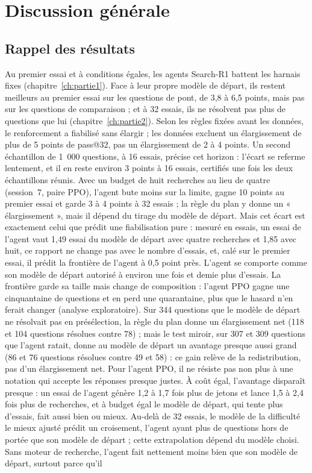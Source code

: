 \chapter{Discussion générale}\label{ch:discussion}

\section{Rappel des résultats}
Au premier essai et à conditions égales, les agents Search-R1 battent les harnais fixes (chapitre~\ref{ch:partie1}). Face à leur propre modèle de départ, ils restent meilleurs au premier essai sur les questions de pont, de 3,8 à 6,5 points, mais pas sur les questions de comparaison ; et à 32 essais, ils ne résolvent pas plus de questions que lui (chapitre~\ref{ch:partie2}). Selon les règles fixées avant les données, le renforcement a fiabilisé sans élargir ; les données excluent un élargissement de plus de 5 points de pass@32, pas un élargissement de 2 à 4 points. Un second échantillon de 1~000 questions, à 16 essais, précise cet horizon : l'écart se referme lentement, et il en reste environ 3 points à 16 essais, certifiés une fois les deux échantillons réunis. Avec un budget de huit recherches au lieu de quatre (session~7, paire PPO), l'agent bute moins sur la limite, gagne 10 points au premier essai et garde 3 à 4 points à 32 essais ; la règle du plan y donne un « élargissement », mais il dépend du tirage du modèle de départ. Mais cet écart est exactement celui que prédit une fiabilisation pure : mesuré en essais, un essai de l'agent vaut 1,49 essai du modèle de départ avec quatre recherches et 1,85 avec huit, ce rapport ne change pas avec le nombre d'essais, et, calé sur le premier essai, il prédit la frontière de l'agent à 0,5 point près. L'agent se comporte comme son modèle de départ autorisé à environ une fois et demie plus d'essais. La frontière garde sa taille mais change de composition : l'agent PPO gagne une cinquantaine de questions et en perd une quarantaine, plus que le hasard n'en ferait changer (analyse exploratoire). Sur 344 questions que le modèle de départ ne résolvait pas en présélection, la règle du plan donne un élargissement net (118 et 104 questions résolues contre 78) ; mais le test miroir, sur 307 et 309 questions que l'agent ratait, donne au modèle de départ un avantage presque aussi grand (86 et 76 questions résolues contre 49 et 58) : ce gain relève de la redistribution, pas d'un élargissement net. Pour l'agent PPO, il ne résiste pas non plus à une notation qui accepte les réponses presque justes. À coût égal, l'avantage disparaît presque : un essai de l'agent génère 1,2 à 1,7 fois plus de jetons et lance 1,5 à 2,4 fois plus de recherches, et à budget égal le modèle de départ, qui tente plus d'essais, fait aussi bien ou mieux. Au-delà de 32 essais, le modèle de la difficulté le mieux ajusté prédit un croisement, l'agent ayant plus de questions hors de portée que son modèle de départ ; cette extrapolation dépend du modèle choisi. Sans moteur de recherche, l'agent fait nettement moins bien que son modèle de départ, surtout parce qu'il 